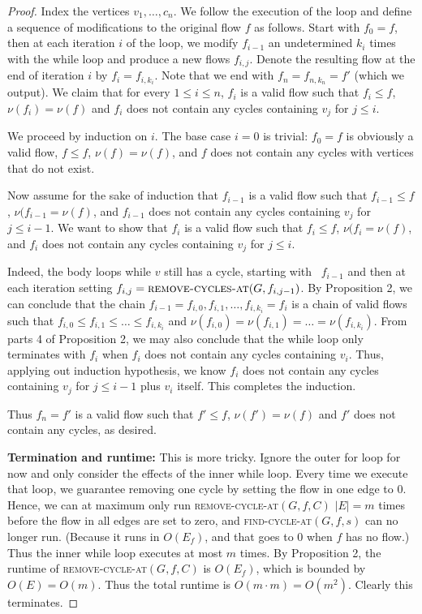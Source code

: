\documentclass[10pt]{article}
\begin{document}
\begin{proof}
  Index the vertices \(v_1, \ldots, c_n\). We follow the execution of the loop and define a sequence of modifications to the original flow \(f\) as follows. Start with \(f_0 = f\), then at each iteration \(i\) of the loop, we modify \(f_{i - 1}\) an undetermined \(k_i\) times with the while loop and produce a new flows \(f_{i,j}\). Denote the resulting flow at the end of iteration \(i\) by \(f_i = f_{i, k_i}\). Note that we end with \(f_n = f_{n, k_n} = f'\) (which we output). We claim that for every \(1 \leq i \leq n\), \(f_i\) is a valid flow such that \(f_i \leq f\), \(\nu(f_i) = \nu(f)\) and \(f_i\) does not contain any cycles containing \(v_j\) for \(j \leq i\).

  We proceed by induction on \(i\). The base case \(i = 0\) is trivial: \(f_0 = f\) is obviously a valid flow, \(f \leq f\), \(\nu(f) = \nu(f)\), and \(f\) does not contain any cycles with vertices that do not exist.

  Now assume for the sake of induction that \(f_{i - 1}\) is a valid flow such that \(f_{i - 1} \leq f\), \(\nu(f_{i - 1} = \nu(f)\), and \(f_{i - 1}\) does not contain any cycles containing \(v_j\) for \(j \leq i - 1\). We want to show that \(f_i\) is a valid flow such that \(f_i \leq f\), \(\nu(f_{i} = \nu(f)\), and \(f_i\) does not contain any cycles containing \(v_j\) for \(j \leq i\). 
  
  Indeed, the body loops while \(v\) still has a cycle, starting with \
  \(f_{i - 1}\) and then at each iteration setting \(f_{i, j} = \textsc{remove-cycles-at}(G, f_{i, j - 1})\). By Proposition 2, we can conclude that the chain \(f_{i - 1} = f_{i, 0}, f_{i, 1}, \ldots, f_{i, k_i} = f_i\) is a chain of valid flows such that \(f_{i, 0} \leq f_{i, 1} \leq \ldots \leq f_{i, k_i}\) and \(\nu(f_{i, 0}) = \nu(f_{i, 1}) = \ldots = \nu(f_{i, k_i})\). From parts 4 of Proposition 2, we may also conclude that the while loop only terminates with \(f_i\) when \(f_i\) does not contain any cycles containing \(v_i\). Thus, applying out induction hypothesis, we know \(f_i\) does not contain any cycles containing \(v_j\) for \(j \leq i - 1\) plus \(v_i\) itself. This completes the induction.

  Thus \(f_n = f'\) is a valid flow such that \(f' \leq f\), \(\nu(f') = \nu(f)\) and \(f'\) does not contain any cycles, as desired.

  \textbf{Termination and runtime:} This is more tricky. Ignore the outer for loop for now and only consider the effects of the inner while loop. Every time we execute that loop, we guarantee removing one cycle by setting the flow in one edge to 0. Hence, we can at maximum only run \textsc{remove-cycle-at}\((G, f, C)\) \(|E| = m\) times before the flow in all edges are set to zero, and \textsc{find-cycle-at}\((G, f, s)\) can no longer run. (Because it runs in \(O(E_f)\), and that goes to 0 when \(f\) has no flow.) Thus the inner while loop executes at most \(m\) times. By Proposition 2, the runtime of \textsc{remove-cycle-at}\((G, f, C)\) is \(O(E_f)\), which is bounded by \(O(E) = O(m)\). Thus the total runtime is \(O(m \cdot m) = O(m^2)\). Clearly this terminates.
\end{proof}
\newpage 
\end{document}
